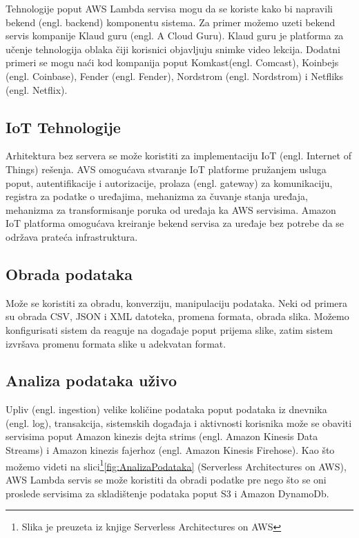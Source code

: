 \documentclass[12pt,oneside]{memoir}
\begin{document}
Tehnologije poput AWS Lambda servisa mogu da se koriste kako bi napravili bekend (engl. backend) komponentu sistema. Za primer možemo uzeti bekend servis kompanije Klaud guru (engl. A Cloud Guru). Klaud guru je platforma za učenje tehnologija oblaka čiji korisnici objavljuju snimke video lekcija. Dodatni primeri se mogu naći kod kompanija poput Komkast(engl. Comcast), Koinbejs (engl. Coinbase), Fender (engl. Fender), Nordstrom (engl. Nordstrom) i Netfliks (engl. Netflix)\cite{ascs}.

\subsection{IoT Tehnologije}

Arhitektura bez servera se može koristiti za implementaciju IoT (engl. Internet of Things) rešenja. AVS omogućava stvaranje IoT platforme pružanjem usluga poput, autentifikacije i autorizacije, prolaza (engl. gateway) za komunikaciju, registra za podatke o uređajima, mehanizma za čuvanje stanja uređaja, mehanizma za transformisanje poruka od uređaja ka AWS servisima\cite{aicf}. Amazon IoT platforma omogućava kreiranje bekend servisa za uređaje bez potrebe da se održava prateća infrastruktura.

\subsection{Obrada podataka}
Može se koristiti za obradu, konverziju, manipulaciju podataka. Neki od primera su obrada CSV, JSON i XML datoteka, promena formata, obrada slika. Možemo konfigurisati sistem da reaguje na događaje poput prijema slike, zatim sistem izvršava promenu formata slike u adekvatan format.

\subsection{Analiza podataka uživo}
Upliv (engl. ingestion) velike količine podataka poput podataka iz dnevnika (engl. log), transakcija, sistemskih događaja i aktivnosti korisnika može se obaviti servisima poput Amazon kinezis dejta strims (engl. Amazon Kinesis Data Streams) i Amazon kinezis fajerhoz (engl. Amazon Kinesis Firehose). Kao što možemo videti na slici\footnote{Slika je preuzeta iz knjige Serverless Architectures on AWS}\ref{fig:AnalizaPodataka} (Serverless Architectures on AWS), AWS Lambda servis se može koristiti da obradi podatke pre nego što se oni proslede servisima za skladištenje podataka poput S3 i Amazon DynamoDb.
\end{document}
